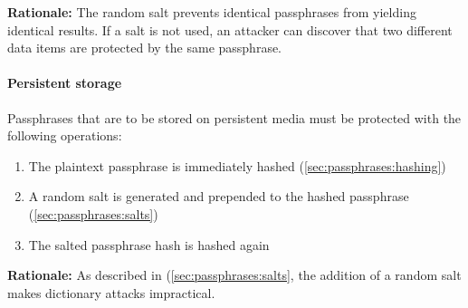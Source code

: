 \documentclass[]{article}
\begin{document}
\textbf{Rationale:} The random salt prevents identical passphrases from yielding identical results. If a salt is not used, an attacker can discover that two different data items are protected by the same passphrase.

\paragraph{Persistent storage}
Passphrases that are to be stored on persistent media must be protected with the following operations:
\begin{enumerate}
\item The plaintext passphrase is immediately hashed (\ref{sec:passphrases:hashing})
\item A random salt is generated and prepended to the hashed passphrase (\ref{sec:passphrases:salts})
\item The salted passphrase hash is hashed again
\end{enumerate}

\textbf{Rationale:} As described in (\ref{sec:passphrases:salts}, the addition of a random salt makes dictionary attacks impractical.
\end{document}
